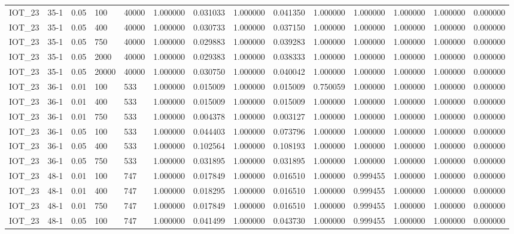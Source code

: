 \begin{tabular}{llllllllllllll}
IOT\_23 & 35-1 & 0.05 & 100 & 40000 & 1.000000 & 0.031033 & 1.000000 & 0.041350 & 1.000000 & 1.000000 & 1.000000 & 1.000000 & 0.000000 \\
IOT\_23 & 35-1 & 0.05 & 400 & 40000 & 1.000000 & 0.030733 & 1.000000 & 0.037150 & 1.000000 & 1.000000 & 1.000000 & 1.000000 & 0.000000 \\
IOT\_23 & 35-1 & 0.05 & 750 & 40000 & 1.000000 & 0.029883 & 1.000000 & 0.039283 & 1.000000 & 1.000000 & 1.000000 & 1.000000 & 0.000000 \\
IOT\_23 & 35-1 & 0.05 & 2000 & 40000 & 1.000000 & 0.029383 & 1.000000 & 0.038333 & 1.000000 & 1.000000 & 1.000000 & 1.000000 & 0.000000 \\
IOT\_23 & 35-1 & 0.05 & 20000 & 40000 & 1.000000 & 0.030750 & 1.000000 & 0.040042 & 1.000000 & 1.000000 & 1.000000 & 1.000000 & 0.000000 \\
IOT\_23 & 36-1 & 0.01 & 100 & 533 & 1.000000 & 0.015009 & 1.000000 & 0.015009 & 0.750059 & 1.000000 & 1.000000 & 1.000000 & 0.000000 \\
IOT\_23 & 36-1 & 0.01 & 400 & 533 & 1.000000 & 0.015009 & 1.000000 & 0.015009 & 1.000000 & 1.000000 & 1.000000 & 1.000000 & 0.000000 \\
IOT\_23 & 36-1 & 0.01 & 750 & 533 & 1.000000 & 0.004378 & 1.000000 & 0.003127 & 1.000000 & 1.000000 & 1.000000 & 1.000000 & 0.000000 \\
IOT\_23 & 36-1 & 0.05 & 100 & 533 & 1.000000 & 0.044403 & 1.000000 & 0.073796 & 1.000000 & 1.000000 & 1.000000 & 1.000000 & 0.000000 \\
IOT\_23 & 36-1 & 0.05 & 400 & 533 & 1.000000 & 0.102564 & 1.000000 & 0.108193 & 1.000000 & 1.000000 & 1.000000 & 1.000000 & 0.000000 \\
IOT\_23 & 36-1 & 0.05 & 750 & 533 & 1.000000 & 0.031895 & 1.000000 & 0.031895 & 1.000000 & 1.000000 & 1.000000 & 1.000000 & 0.000000 \\
IOT\_23 & 48-1 & 0.01 & 100 & 747 & 1.000000 & 0.017849 & 1.000000 & 0.016510 & 1.000000 & 0.999455 & 1.000000 & 1.000000 & 0.000000 \\
IOT\_23 & 48-1 & 0.01 & 400 & 747 & 1.000000 & 0.018295 & 1.000000 & 0.016510 & 1.000000 & 0.999455 & 1.000000 & 1.000000 & 0.000000 \\
IOT\_23 & 48-1 & 0.01 & 750 & 747 & 1.000000 & 0.017849 & 1.000000 & 0.016510 & 1.000000 & 0.999455 & 1.000000 & 1.000000 & 0.000000 \\
IOT\_23 & 48-1 & 0.05 & 100 & 747 & 1.000000 & 0.041499 & 1.000000 & 0.043730 & 1.000000 & 0.999455 & 1.000000 & 1.000000 & 0.000000 \\

\end{tabular}
